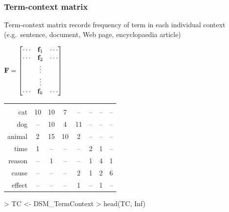 \documentclass[t]{beamer} %
\begin{document}
\begin{frame}[fragile]
  \frametitle{Term-context matrix}

  \h{Term-context matrix} records frequency of term in each individual context (e.g.\ sentence, document, Web page, encyclopaedia article)
  
  \gap[2]
  \begin{center}
  \(
  \mathbf{F} = 
  \begin{bmatrix}
    \cdots & \vf_1 & \cdots \\
    \cdots & \vf_2 & \cdots \\
    & \vdots & \\
    & \vdots & \\
    \cdots & \vf_k & \cdots \\
  \end{bmatrix}
  \)
  \hspace{5mm}
  \begin{small}
    \setlength{\arrayrulewidth}{1pt}
    \begin{tabular}[c]{r*{7}{|c}|}
      & 
      & 
      & 
      & 
      & 
      & 
      &  \\
      cat      &      10 &  10 &     7 &    -- &         -- &   -- &        -- \\
      dog      &      -- &  10 &     4 &    11 &         -- &   -- &        -- \\
      animal   &       2 &  15 &    10 &     2 &         -- &   -- &        -- \\
      time     &       1 &  -- &    -- &    -- &          2 &    1 &        -- \\
      reason   &      -- &   1 &    -- &    -- &          1 &    4 &         1 \\
      cause    &      -- &  -- &    -- &     2 &          1 &    2 &         6 \\
      effect   &      -- &  -- &    -- &     1 &         -- &    1 &        -- \\
    \end{tabular}
  \end{small}
  \end{center}

\begin{Rcode}
> TC <- DSM_TermContext
> head(TC, Inf) 
\end{Rcode}
\end{frame}
\end{document}
